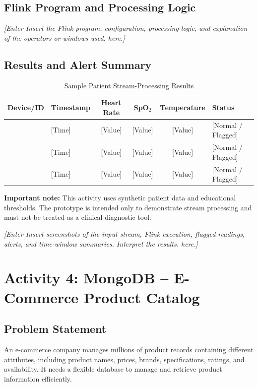 \documentclass[12pt,a4paper]{report}
\newcommand{\placeholder}[1]{\textit{[Enter #1 here.]}}
\newcommand{\activityheading}[2]{%
  \section{Activity #1: #2}%
}
\begin{document}
\subsection{Flink Program and Processing Logic}
\placeholder{Insert the Flink program, configuration, processing logic,
and explanation of the operators or windows used.}

\subsection{Results and Alert Summary}
\begin{table}[H]
\centering
\caption{Sample Patient Stream-Processing Results}
\begin{tabularx}{\textwidth}{|l|l|c|c|c|X|}
\hline
\textbf{Device/ID} & \textbf{Timestamp} & \textbf{Heart Rate} &
\textbf{SpO$_2$} & \textbf{Temperature} & \textbf{Status}\\
\hline
[ID 1] & [Time] & [Value] & [Value] & [Value] & [Normal / Flagged]\\
\hline
[ID 2] & [Time] & [Value] & [Value] & [Value] & [Normal / Flagged]\\
\hline
[ID 3] & [Time] & [Value] & [Value] & [Value] & [Normal / Flagged]\\
\hline
\end{tabularx}
\end{table}

\noindent\textbf{Important note:} This activity uses synthetic patient data
and educational thresholds. The prototype is intended only to demonstrate
stream processing and must not be treated as a clinical diagnostic tool.

\placeholder{Insert screenshots of the input stream, Flink execution,
flagged readings, alerts, and time-window summaries. Interpret the results.}

\clearpage
\activityheading{4}{MongoDB -- E-Commerce Product Catalog}

\subsection{Problem Statement}
An e-commerce company manages millions of product records containing
different attributes, including product names, prices, brands,
specifications, ratings, and availability. It needs a flexible database
to manage and retrieve product information efficiently.
\end{document}
